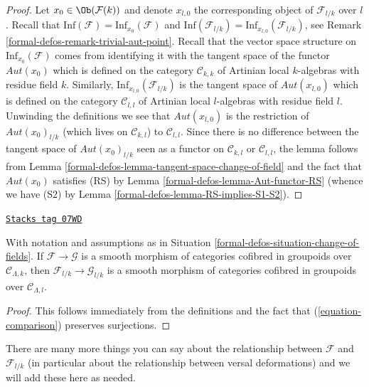 \begin{proof}
Let $x_0 \in \Ob(\mathcal{F}(k))$ and denote $x_{l, 0}$ the corresponding
object of $\mathcal{F}_{l/k}$ over $l$. Recall that
$\text{Inf}(\mathcal{F}) = \text{Inf}_{x_0}(\mathcal{F})$ and
$\text{Inf}(\mathcal{F}_{l/k}) = \text{Inf}_{x_{l, 0}}(\mathcal{F}_{l/k})$,
see Remark \ref{formal-defos-remark-trivial-aut-point}.
Recall that the vector space structure on
$\text{Inf}_{x_0}(\mathcal{F})$ comes from identifying it with the tangent
space of the functor $\mathit{Aut}(x_0)$ which is defined on
the category $\mathcal{C}_{k, k}$ of Artinian local $k$-algebras with
residue field $k$. Similarly, $\text{Inf}_{x_{l, 0}}(\mathcal{F}_{l/k})$
is the tangent space of $\mathit{Aut}(x_{l, 0})$ which is defined on the
category $\mathcal{C}_{l, l}$ of Artinian local $l$-algebras with residue
field $l$. Unwinding the definitions we see that
$\mathit{Aut}(x_{l, 0})$ is the restriction of $\mathit{Aut}(x_0)_{l/k}$
(which lives on $\mathcal{C}_{k, l}$) to $\mathcal{C}_{l, l}$. Since
there is no difference between the tangent space of
$\mathit{Aut}(x_0)_{l/k}$ seen as a functor on $\mathcal{C}_{k, l}$ or
$\mathcal{C}_{l, l}$, the lemma follows from
Lemma \ref{formal-defos-lemma-tangent-space-change-of-field}
and the fact that $\mathit{Aut}(x_0)$ satisfies (RS) by
Lemma \ref{formal-defos-lemma-Aut-functor-RS} (whence we have (S2) by
Lemma \ref{formal-defos-lemma-RS-implies-S1-S2}).
\end{proof}

\begin{lemma}
\label{formal-defos-lemma-change-of-fields-smooth}
\href{https://stacks.math.columbia.edu/tag/07WD}{\texttt{Stacks tag 07WD}}

With notation and assumptions as in Situation \ref{formal-defos-situation-change-of-fields}.
If $\mathcal{F} \to \mathcal{G}$ is a smooth morphism of categories cofibred
in groupoids over $\mathcal{C}_{\Lambda, k}$, then
$\mathcal{F}_{l/k} \to \mathcal{G}_{l/k}$ is a smooth morphism of categories
cofibred in groupoids over $\mathcal{C}_{\Lambda, l}$.
\end{lemma}

\begin{proof}
This follows immediately from the definitions and the fact that
(\ref{equation-comparison}) preserves surjections.
\end{proof}

There are many more things you can say about the relationship between
$\mathcal{F}$ and $\mathcal{F}_{l/k}$ (in particular about the relationship
between versal deformations) and we will add these here as needed.

